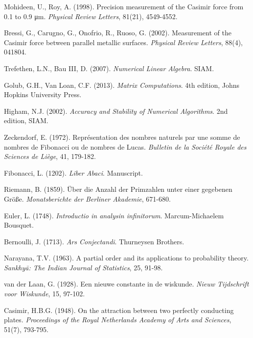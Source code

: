 \documentclass[12pt]{article}
\theoremstyle{plain}
\theoremstyle{definition}
\begin{document}
\begin{thebibliography}{99}
 Mohideen, U., Roy, A. (1998). Precision measurement of the Casimir force from 0.1 to 0.9 μm. \emph{Physical Review Letters}, 81(21), 4549-4552.

 Bressi, G., Carugno, G., Onofrio, R., Ruoso, G. (2002). Measurement of the Casimir force between parallel metallic surfaces. \emph{Physical Review Letters}, 88(4), 041804.

 Trefethen, L.N., Bau III, D. (2007). \emph{Numerical Linear Algebra}. SIAM.

 Golub, G.H., Van Loan, C.F. (2013). \emph{Matrix Computations}. 4th edition, Johns Hopkins University Press.

 Higham, N.J. (2002). \emph{Accuracy and Stability of Numerical Algorithms}. 2nd edition, SIAM.

 Zeckendorf, E. (1972). Représentation des nombres naturels par une somme de nombres de Fibonacci ou de nombres de Lucas. \emph{Bulletin de la Société Royale des Sciences de Liège}, 41, 179-182.

 Fibonacci, L. (1202). \emph{Liber Abaci}. Manuscript.

 Riemann, B. (1859). Über die Anzahl der Primzahlen unter einer gegebenen Größe. \emph{Monatsberichte der Berliner Akademie}, 671-680.

 Euler, L. (1748). \emph{Introductio in analysin infinitorum}. Marcum-Michaelem Bousquet.

 Bernoulli, J. (1713). \emph{Ars Conjectandi}. Thurneysen Brothers.

 Narayana, T.V. (1963). A partial order and its applications to probability theory. \emph{Sankhyā: The Indian Journal of Statistics}, 25, 91-98.

 van der Laan, G. (1928). Een nieuwe constante in de wiskunde. \emph{Nieuw Tijdschrift voor Wiskunde}, 15, 97-102.

 Casimir, H.B.G. (1948). On the attraction between two perfectly conducting plates. \emph{Proceedings of the Royal Netherlands Academy of Arts and Sciences}, 51(7), 793-795.
\end{thebibliography}
\end{document}
